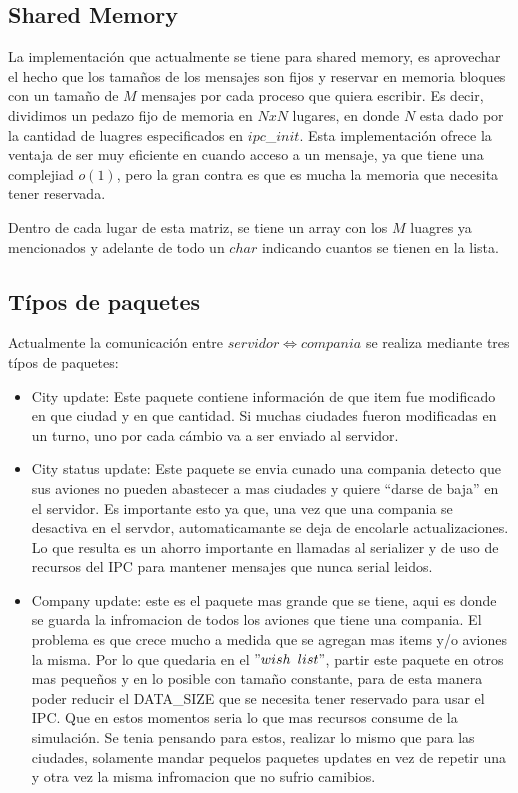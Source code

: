 \documentclass[a4paper,12pt,spanish]{article} %
\begin{document}
\subsection{Shared Memory}

La implementación que actualmente se tiene para shared memory, es
aprovechar el hecho que los tamaños de los mensajes son fijos y reservar
en memoria bloques con un tamaño de $M$ mensajes por cada proceso
que quiera escribir. Es decir, dividimos un pedazo fijo de memoria
en $NxN$ lugares, en donde $N$ esta dado por la cantidad de luagres
especificados en $ipc$\_$init$. Esta implementación ofrece la ventaja
de ser muy eficiente en cuando acceso a un mensaje, ya que tiene una
complejiad $o(1)$, pero la gran contra es que es mucha la memoria
que necesita tener reservada.

Dentro de cada lugar de esta matriz, se tiene un array con los $M$
luagres ya mencionados y adelante de todo un $char$ indicando cuantos
se tienen en la lista.


\subsection{Típos de paquetes}

Actualmente la comunicación entre $servidor\Longleftrightarrow compania$
se realiza mediante tres típos de paquetes:\\

\begin{itemize}
\item City update: Este paquete contiene información de que item fue modificado
en que ciudad y en que cantidad. Si muchas ciudades fueron modificadas
en un turno, uno por cada cámbio va a ser enviado al servidor.
\item City status update: Este paquete se envia cunado una compania detecto
que sus aviones no pueden abastecer a mas ciudades y quiere {}``darse
de baja'' en el servidor. Es importante esto ya que, una vez que
una compania se desactiva en el servdor, automaticamante se deja de
encolarle actualizaciones. Lo que resulta es un ahorro importante
en llamadas al serializer y de uso de recursos del IPC para mantener
mensajes que nunca serial leidos.
\item Company update: este es el paquete mas grande que se tiene, aqui es
donde se guarda la infromacion de todos los aviones que tiene una
compania. El problema es que crece mucho a medida que se agregan mas
items y/o aviones la misma. Por lo que quedaria en el $"wish$ $list"$,
partir este paquete en otros mas pequeños y en lo posible con tamaño
constante, para de esta manera poder reducir el DATA\_SIZE que se
necesita tener reservado para usar el IPC. Que en estos momentos seria
lo que mas recursos consume de la simulación. Se tenia pensando para
estos, realizar lo mismo que para las ciudades, solamente mandar pequelos
paquetes updates en vez de repetir una y otra vez la misma infromacion
que no sufrio camibios.
\end{itemize}
\pagebreak{}
\end{document}
